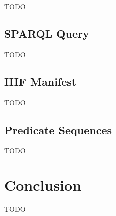 TODO

\subsection{SPARQL Query}

TODO

\subsection{IIIF Manifest}

TODO

\subsection{Predicate Sequences}

TODO

\section{Conclusion}

TODO